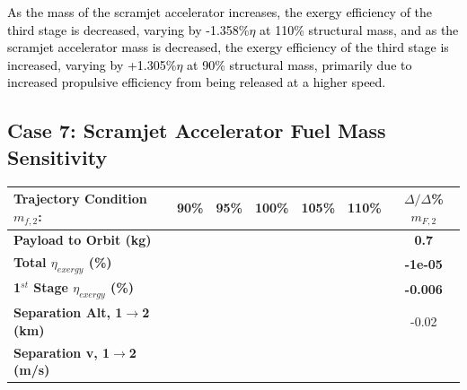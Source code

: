 \textcolor{black}{
As the mass of the scramjet accelerator increases, the exergy efficiency of the third stage is decreased, varying by -1.358\%$\eta$ at 110\% structural mass, and as the scramjet accelerator mass is decreased, the exergy efficiency of the third stage is increased, varying by +1.305\%$\eta$ at 90\% structural mass, primarily due to increased propulsive efficiency from being released at a higher speed. }


\subsection{Case 7: Scramjet Accelerator Fuel Mass Sensitivity} \label{sec:fuelmassNoReturn}

\begin{table}[!ht] %
\begin{tabular}{l c c c c c c} 
	\hline \textbf{Trajectory Condition}   \qquad  $m_{f,2}$:
	&90\%
	&95\%
	&100\%
	&105\%
	&110\%
	& $\Delta/\Delta$\%$m_{F,2}$
	\\
	\hline \textbf{Payload to Orbit (kg)}
	& \textbf{\PayloadToOrbitmFuelNinetyNoReturn}
	& \textbf{\PayloadToOrbitmFuelNinetyFiveNoReturn}
	& \textbf{\PayloadToOrbitmFuelStandardNoReturn}
	& \textbf{\PayloadToOrbitmFuelOneHundredFiveNoReturn}
	& \textbf{\PayloadToOrbitmFuelOneHundredTenNoReturn}
	&\textbf{0.7}
	\\
	\textbf{Total $\eta_{exergy}$ (\%)}
	& \textbf{\totalExergyEffmFuelNinetyNoReturn}
	& \textbf{\totalExergyEffmFuelNinetyFiveNoReturn}
	& \textbf{\totalExergyEffmFuelStandardNoReturn}
	& \textbf{\totalExergyEffmFuelOneHundredFiveNoReturn}
	& \textbf{\totalExergyEffmFuelOneHundredTenNoReturn}
	& \textbf{-1e-05}
	\\
	\hline 
	\textbf{1$^{st}$ Stage $\eta_{exergy}$ (\%)}
	& \textbf{\firstExergyEffmFuelNinetyNoReturn}
	& \textbf{\firstExergyEffmFuelNinetyFiveNoReturn}
	& \textbf{\firstExergyEffmFuelStandardNoReturn}
	& \textbf{\firstExergyEffmFuelOneHundredFiveNoReturn}
	& \textbf{\firstExergyEffmFuelOneHundredTenNoReturn}
	& \textbf{-0.006}
	\\
	\textbf{Separation Alt, 1$\rightarrow$2 (km)}
	& \firstsecondSeparationAltmFuelNinetyNoReturn
	& \firstsecondSeparationAltmFuelNinetyFiveNoReturn
	& \firstsecondSeparationAltmFuelStandardNoReturn
	& \firstsecondSeparationAltmFuelOneHundredFiveNoReturn
	& \firstsecondSeparationAltmFuelOneHundredTenNoReturn
	&-0.02
	\\
	\textbf{Separation v, 1$\rightarrow$2 (m/s)}
	& \firstsecondSeparationvmFuelNinetyNoReturn

\end{tabular}
\end{table}
